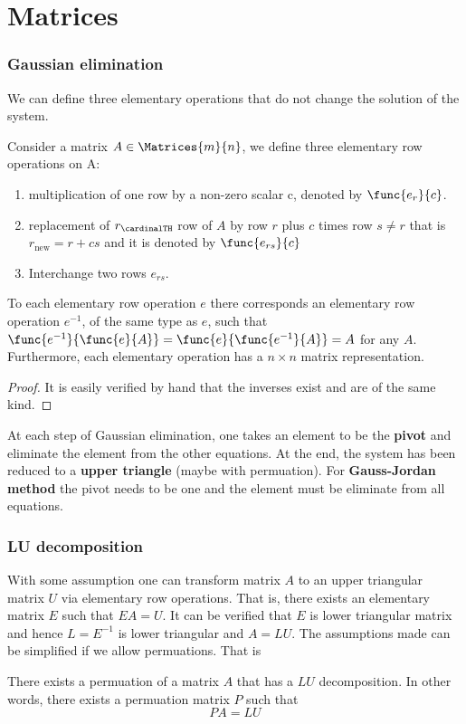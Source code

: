 \chapter{Matrices}
\thispagestyle{headings}
\subsection{Gaussian elimination}
We can define three elementary operations that do not change the solution of the system.
\begin{definition}
    Consider a matrix \(A \in \Matrices{m}{n}\), we define three elementary row operations on A:
    \begin{enumerate}
        \item multiplication of one row by a non-zero scalar c, denoted by \(\func{e_r}{c}\).
        \item replacement of \(r_\cardinalTH\) row of \(A\) by row \(r\) plus \(c\) times row \(s \neq r\) that is \(r_{\text{new}} = r + cs\) and it is denoted by \(\func{e_{rs}}{c}\)
        \item Interchange two rows \(e_{rs}\).
    \end{enumerate}

\end{definition}

\begin{theorem}
    To each elementary row operation \(e\) there corresponds an elementary row operation \(e^{-1}\), of the same type as \(e\), such that \(\func{e^{-1}}{\func{e}{A}} = \func{e}{\func{e^{-1}}{A}} = A\) for any \(A\). Furthermore, each elementary operation has a \(n \times n\) matrix representation.
\end{theorem}

\begin{proof}
    It is easily verified by hand that the inverses exist and are of the same kind.
\end{proof}
At each step of Gaussian elimination, one takes an element to be the \textbf{pivot} and eliminate the element from the other equations. At the end, the system has been reduced to a \textbf{upper triangle} (maybe with permuation).
For \textbf{Gauss-Jordan method} the pivot needs to be one and the element must be eliminate from all equations.
\subsection{LU decomposition}
With some assumption one can transform matrix \(A\) to an upper triangular matrix \(U\) via elementary row operations. That is, there exists an elementary matrix \(E\) such that \(EA = U\). It can be verified that \(E\) is lower triangular matrix and hence \(L = E^{-1}\) is lower triangular and \(A = LU\). The assumptions made can be simplified if we allow permuations. That is
\begin{theorem}
    There exists a permuation of a matrix \(A\) that has a \(LU\) decomposition. In other words, there exists a permuation matrix \(P\) such that
    \begin{equation*}
        PA = LU
    \end{equation*}
\end{theorem}

